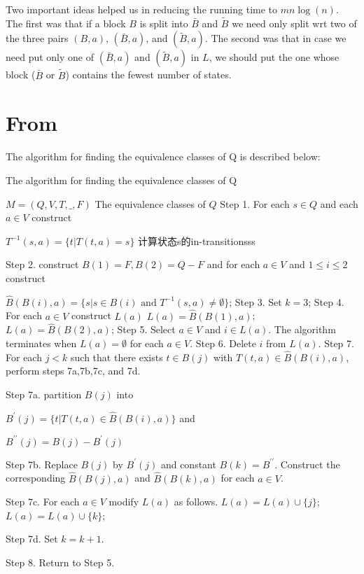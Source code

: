 Two important ideas helped us in reducing the running time to $mn\log (n)$. The first was that if a block $B$ is split into $\bar{B}$ and $\tilde{B}$ we need only split wrt two of the three pairs $(B, a)$, $(\bar{B}, a)$, and $(\tilde{B}, a)$. The second was that in case we need put only one of $(\bar{B}, a)$ and $(\tilde{B}, a)$ in $L$, we should put the one whose block ($\bar{B}$ or $\tilde{B}$) contains the fewest number of states.

\section{From \cite{Hopcroft71}}

The algorithm for finding the equivalence classes of Q is described below:

\begin{algorithm}  
	\caption{The algorithm for finding the equivalence classes of Q}  
	\begin{algorithmic}%
		\Require $M=(Q,V,T,\_,F)$  
		\Ensure The equivalence classes of $Q$  
		\State Step 1. For each $s\in Q$ and each $a\in V$ construct
		
		$T^{-1}(s,a)=\{t|T(t,a)=s\}$ \qquad 计算状态s的in-transitionsss
		
		\State Step 2. construct $B(1)=F, B(2)=Q-F$ and for each $a\in V$ and $1\le i\le 2$ construct
		
				\State $\hat{B}(B(i),a)=\{s|s\in B(i) \text{ and } T^{-1}(s,a)\ne \emptyset\}$;
			\EndFor  
		\EndFor 
		\State Step 3. Set $k=3$;
		\State Step 4. For each $a\in V$ construct $L(a)$
				\State $L(a) = \hat{B}(B(1),a)$;
			\Else
	            \State $L(a) = \hat{B}(B(2),a)$; 
			\EndIf
		\EndFor
		\State Step 5. Select $a\in V$ and $i\in L(a)$. The algorithm terminates when $L(a)=\emptyset$ for each $a\in V$.
		\State Step 6. Delete $i$ from $L(a)$.
		\State Step 7. For each $j<k$ such that there exists $t\in B(j)$ with $T(t,a)\in \hat{B}(B(i),a)$, perform steps 7a,7b,7c, and 7d.
		
		\State Step 7a. partition $B(j)$ into
			
			$B^\prime(j)=\{t|T(t,a)\in \hat{B}(B(i),a)\}$ and			
		
			$B^{\prime\prime}(j)=B(j)-B^\prime(j)$
		
		\State Step 7b. Replace $B(j)$ by $B^\prime(j)$ and constant $B(k)=B^{\prime\prime}$. Construct the corresponding $\hat{B}(B(j),a)$ and $\hat{B}(B(k),a)$ for each $a\in V$.
		
		\State Step 7c. For each $a\in V$ modify $L(a)$ as follows.
				\State $L(a) = L(a)\cup \{j\}$;
			\Else
				\State $L(a) = L(a)\cup \{k\}$;
			\EndIf 
			
		\State Step 7d. Set $k=k+1$.
		
		\State Step 8. Return to Step 5.
	\end{algorithmic}   
\end{algorithm}

